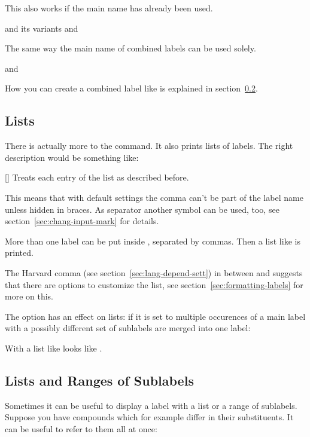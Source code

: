 \documentclass[load-preamble+,babel-options={ngerman,british,american}]{cnltx-doc}
\begin{document}
This also works if the main name has already been used.
\begin{example}
   and its variants  and 
\end{example}

The same way the main name of combined labels can be used solely.
\begin{example}
   and 
\end{example}

How you can create a combined label like  is explained in
section~\ref{sec:lists-rang-subl}.

\subsection{Lists}\label{sec:lists}
There is actually more to the  command.  It also prints lists of
labels.  The right description would be something like:
\begin{commands}
  []
    Treats each entry of the list as described before.
\end{commands}
This means that with default settings the comma can't be part of the label
name unless hidden in braces.  As separator another symbol can be used, too,
see section~\ref{sec:chang-input-mark} for details.

\begin{example}
  More than one label can be put inside , separated by commas.  Then
  a list like  is printed.
\end{example}
The Harvard comma (see section~\ref{sec:lang-depend-sett}) in 
between  and  suggests that there are options to customize
the list, see section~\ref{sec:formatting-labels} for more on this.

The option  has an effect on lists: if it is set to 
multiple occurences of a main label with a possibly different set of sublabels
are merged into one label:

\begin{example}
  With  a list like  looks
  like .
\end{example}

\subsection{Lists and Ranges of Sublabels}\label{sec:lists-rang-subl}
Sometimes it can be useful to display a label with a list or a range of
sublabels.  Suppose you have compounds
 which for example differ in their
substituents.  It can be useful to refer to them all at once:
\end{document}
